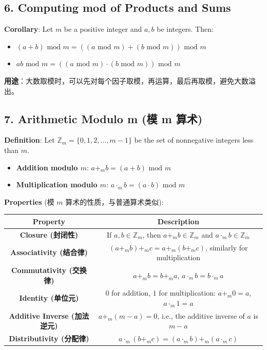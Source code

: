 \documentclass[10pt,a4paper,openany]{ctexbook}
\theoremstyle{definition}
\theoremstyle{remark}
\renewenvironment{quote}
  {\list{}{\leftmargin=1em\rightmargin=0pt\topsep=0.5pt\partopsep=0pt}\item[]}
  {\endlist}
\begin{document}
\vspace{-2pt}

\subsection{6. Computing mod of Products and Sums}

\textbf{Corollary}: Let $m$ be a positive integer and $a, b$ be integers. Then:
\begin{itemize}
\item $(a + b) \text{ mod } m = ((a \text{ mod } m) + (b \text{ mod } m)) \text{ mod } m$
\item $ab \text{ mod } m = ((a \text{ mod } m) \cdot (b \text{ mod } m)) \text{ mod } m$

\end{itemize}

\begin{quote}
\textbf{用途}：大数取模时，可以先对每个因子取模，再运算，最后再取模，避免大数溢出。

\end{quote}
\vspace{-2pt}

\subsection{7. Arithmetic Modulo m (模 m 算术)}

\textbf{Definition}: Let $\mathbb{Z}_m = \{0, 1, 2, \dots, m-1\}$ be the set of nonnegative integers less than $m$.
\begin{itemize}
\item \textbf{Addition modulo $m$}: $a +_m b = (a + b) \text{ mod } m$
\item \textbf{Multiplication modulo $m$}: $a \cdot_m b = (a \cdot b) \text{ mod } m$

\end{itemize}

\textbf{Properties} (模 $m$ 算术的性质，与普通算术类似):
\begin{center}
\begin{tabular}{cc}
\hline
Property & Description \\ \hline
\textbf{Closure (封闭性)} & If $a, b \in \mathbb{Z}_m$, then $a +_m b \in \mathbb{Z}_m$ and $a \cdot_m b \in \mathbb{Z}_m$ \\
\textbf{Associativity (结合律)} & $(a +_m b) +_m c = a +_m (b +_m c)$, similarly for multiplication \\
\textbf{Commutativity (交换律)} & $a +_m b = b +_m a$, $a \cdot_m b = b \cdot_m a$ \\
\textbf{Identity (单位元)} & $0$ for addition, $1$ for multiplication: $a +_m 0 = a$, $a \cdot_m 1 = a$ \\
\textbf{Additive Inverse (加法逆元)} & $a +_m (m - a) = 0$, i.e., the additive inverse of $a$ is $m - a$ \\
\textbf{Distributivity (分配律)} & $a \cdot_m (b +_m c) = (a \cdot_m b) +_m (a \cdot_m c)$ \\
\hline
\end{tabular}

\end{center}
\end{document}
